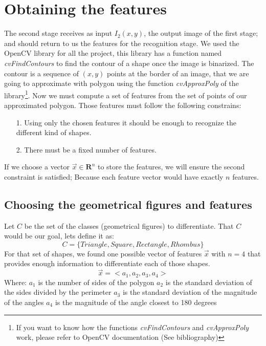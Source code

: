 \documentclass[10pt,journal]{IEEEtran}
\begin{document}
	\section{Obtaining the features}
	The second stage receives as input $I_2(x,y)$, the output image of the first
	stage; and should return to us the features for the recognition stage. We used the 
	OpenCV library for all the project, this library has a function named
	\textit{cvFindContours} to find the contour of a shape once the image is
	binarized. The contour is a sequence of $(x,y)$ points at the border of an image,
	that we are going to approximate with polygon using the function 
	\textit{cvApproxPoly} of the library\footnote {If you want to know how the 
	functions \textit{cvFindContours} and \textit{cvApproxPoly} work, please 
	refer to OpenCV	documentation (See bibliography)}.
	Now we must compute a set of features from the set of points of our 
	approximated polygon. Those features must follow the following constrains:
	\begin{itemize}
		\item[1.] Using only the chosen features it should be enough to recognize the
			different kind of shapes.
		\item[2.] There must be a fixed number of features.
	\end{itemize}
	If we choose a vector $\vec{x} \in \mathbf{R}^n$ to store the features, we will
	ensure the second constraint is satisfied; Because each feature vector would have
	exactly $n$ features.
	
	\subsection{Choosing the geometrical figures and features}
	Let $C$ be the set of the classes (geometrical figures) to differentiate. That 
	$C$ would be our goal, lets define it as:
	\[C = \{ Triangle, Square, Rectangle, Rhombus \} \]
	For that set of shapes, we found one possible vector of features $\vec{x}$ with
	$n=4$ that provides enough information to differentiate each of those shapes.
	\[\vec{x} = <a_1,a_2,a_3,a_4> \]
	Where:\newline
	$a_1$ is the number of sides of the polygon\newline
	$a_2$ is the standard deviation of the sides divided by the perimeter\newline
	$a_3$ is the standard deviation of the magnitude of the angles\newline
	$a_4$ is the magnitude of the angle closest to 180 degrees\newline
	
\end{document}
